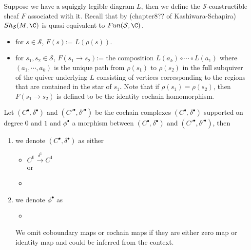 \begin{definition}
Suppose we have a squiggly legible diagram $L$, then we define the $\mathcal{S}$-constructible sheaf $F$ associated with it. Recall that by (chapter8?? of Kashiwara-Schapira) $Sh_{\mathcal{S}}(M,\C)$ is quasi-equivalent to $Fun(\mathcal{S},\C)$.
\begin{itemize}
\item for $s \in \mathcal{S}$, $F(s)$:= $L(\rho(s))$.

\item for $s_1,s_2 \in \mathcal{S}$, $F(s_1 \rightarrow s_2)$:= the composition $L(a_k)\circ \cdots \circ L(a_1)$ where $(a_1,\cdots,a_k)$ is the unique path from $\rho(s_1)$ to $\rho(s_2)$ in the full subquiver of the quiver underlying $L$ consisting of vertices corresponding to the regions that are contained in the star of $s_1$. Note that if $\rho(s_1)=\rho(s_2)$, then $F(s_1 \rightarrow s_2)$ is defined to be the identity cochain homomorphism.
\end{itemize}
\end{definition}
\begin{definition} 
Let $(C^\bullet,\delta^\bullet)$ and $(C'^\bullet,\delta'^\bullet)$ be the cochain complexes $(C^\bullet,\delta^\bullet)$ supported on degree $0$ and $1$ and $\phi^\bullet$ a morphism between $(C^\bullet,\delta^\bullet)$ and $(C'^\bullet,\delta'^\bullet)$, then
\begin{enumerate}
\item we denote $(C^\bullet,\delta^\bullet)$ as either 
\begin{itemize}
\item $C^0 \xrightarrow{\delta^1} C^1$ \\
or  
\item {}
\end{itemize}

\item we denote $\phi^\bullet$ as 
\begin{itemize}
\item {}
\end{itemize}
We omit coboundary maps or cochain maps if they are either zero map or identity map and could be inferred from the context.
\end{enumerate}
\end{definition}

